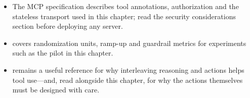 \begin{itemize}[itemsep=2pt]
  \item The MCP specification \citep{mcp2026spec} describes tool annotations, authorization and the stateless transport used in this chapter; read the security considerations section before deploying any server.
  \item \citet{kohavi2020trustworthy} covers randomization units, ramp-up and guardrail metrics for experiments such as the pilot in this chapter.
  \item \citet{yao2023react} remains a useful reference for why interleaving reasoning and actions helps tool use---and, read alongside this chapter, for why the actions themselves must be designed with care.
\end{itemize}
